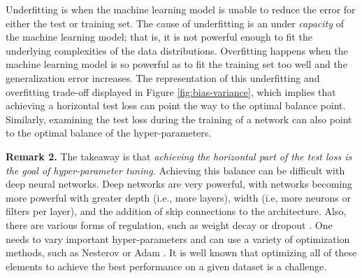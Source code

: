 \documentclass{article} %
\begin{document}
Underfitting is when the machine learning model is unable to reduce the error for either the test or training set.  The cause of underfitting is an under \emph{capacity} of the machine learning model; that is, it is not powerful enough to fit the underlying complexities of the data distributions.  Overfitting happens when the machine learning model is so powerful as to fit the training set too well and the generalization error increases.  The representation of this underfitting and overfitting trade-off displayed in Figure \ref{fig:bias-variance}, which implies that achieving a horizontal test loss can point the way to the optimal balance point.  Similarly, examining the test loss during the training of a network can also point to the optimal balance of the hyper-parameters.  

\textbf{Remark 2.} The takeaway is that \emph{achieving the horizontal part of the test loss is the goal of hyper-parameter tuning.}
Achieving this balance can be difficult with deep neural networks.   Deep networks are very powerful, with networks becoming more powerful with greater depth (i.e., more layers), width (i.e, more neurons or filters per layer), and the addition of  skip connections to the architecture.   Also, there are various forms of regulation, such as weight decay or dropout \citep{srivastava2014dropout}.  One needs to vary important hyper-parameters and can use a variety of optimization methods, such as Nesterov or Adam \citep{kingma2014adam}.  It is well known that optimizing all of these elements to achieve the best performance on a given dataset is a challenge.  





\end{document}
